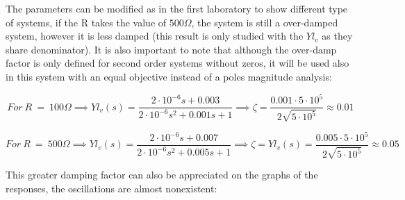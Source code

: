 \documentclass[a4paper,12pt]{article}
\begin{document}
The parameters can be modified as in the first laboratory to show different type of systems, if the R takes the value of $500\Omega$, the system is still a over-damped system, however it is less damped (this result is only studied with the $Yl_v$ as they share denominator). It is also important to note that although the over-damp factor is only defined for second order systems without zeros, it will be used also in this system with an equal objective instead of a poles magnitude analysis:

\vspace{0.5cm}

\[For \ R \ = \ 100\Omega \implies Yl_v(s) =\frac{2\cdot10^{-6}s + 0.003}{2\cdot10^{-6}s^2 + 0.001s + 1} \implies \zeta = \frac{0.001\cdot5\cdot10^5}{2\sqrt{5\cdot10^5}} \approx 0.01\]

\[For \ R \ = \ 500\Omega \implies Yl_v(s) = \frac{2\cdot10^{-6}s + 0.007}{2\cdot10^{-6}s^2 + 0.005s + 1} \implies \zeta = Yl_v(s) = \frac{0.005\cdot5\cdot10^5}{2\sqrt{5\cdot10^5}} \approx 0.05\]

\vspace{0.5cm}

This greater damping factor can also be appreciated on the graphs of the responses, the oscillations are almost nonexistent:

\vspace{0.5cm}
\end{document}
